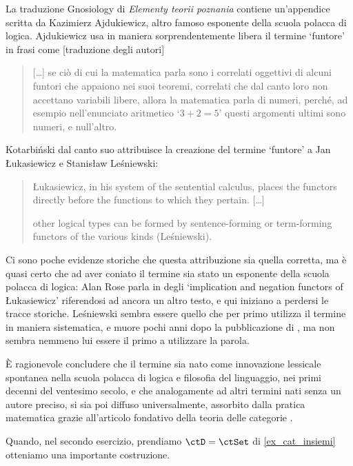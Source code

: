 \begin{terminology}
 La traduzione Gnosiology di \emph{Elementy teorii poznania} contiene un'appendice scritta da Kazimierz Ajdukiewicz, altro famoso esponente della scuola polacca di logica. Ajdukiewicz usa in maniera sorprendentemente libera il termine `funtore' in frasi come [traduzione degli autori]
 \begin{quote}
  [\dots\unkern] se ciò di cui la matematica parla sono i correlati oggettivi di alcuni funtori che appaiono nei suoi teoremi, correlati che dal canto loro non accettano variabili libere, allora la matematica parla di numeri, perché, ad esempio nell'enunciato aritmetico `\(3 + 2 = 5\)' questi argomenti ultimi sono numeri, e null'altro.
 \end{quote}
 Kotarbiński dal canto suo attribuisce la creazione del termine `funtore' a Jan Łukasiewicz e Stanisław Leśniewski:
 \begin{quotation}
  {\L}ukasiewicz, in his system of the sentential calculus, places the functors directly before the functions to which they pertain. [\dots\unkern]

  other logical types can be formed by sentence-forming or term-forming functors of the various kinds (Leśniewski).
 \end{quotation}
 Ci sono poche evidenze storiche che questa attribuzione sia quella corretta, ma è quasi certo che ad aver coniato il termine sia stato un esponente della scuola polacca di logica: Alan Rose parla in \cite{CM_1968__20__153_0} degli `implication and negation functors of Łukasiewicz' riferendosi ad ancora un altro testo, e qui iniziano a perdersi le tracce storiche. Leśniewski sembra essere quello che per primo utilizza il termine in maniera sistematica, e muore pochi anni dopo la pubblicazione di \cite{carnappio}, ma non sembra nemmeno lui essere il primo a utilizzare la parola.

 È ragionevole concludere che il termine sia nato come innovazione lessicale spontanea nella scuola polacca di logica e filosofia del linguaggio, nei primi decenni del ventesimo secolo, e che analogamente ad altri termini nati senza un autore preciso, si sia poi diffuso universalmente, assorbito dalla pratica matematica grazie all'articolo fondativo della teoria delle categorie \cite{gtone}.
\end{terminology}
Quando, nel secondo esercizio, prendiamo \(\ctD=\ctSet\) di \ref{ex_cat_insiemi} otteniamo una importante costruzione.
